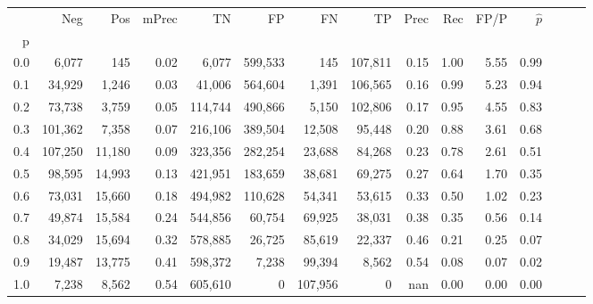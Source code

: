 \begin{tabular}{rrrrrrrrrrrrrrr}
\toprule
{} &      Neg &     Pos & mPrec &       TN &       FP &       FN &       TP &  Prec &   Rec &  FP/P & $\hat{p}$ \\
p   &          &         &       &          &          &          &          &       &       &       &           \\
\midrule
0.0 &    6,077 &     145 &  0.02 &    6,077 &  599,533 &      145 &  107,811 &  0.15 &  1.00 &  5.55 &      0.99 \\
0.1 &   34,929 &   1,246 &  0.03 &   41,006 &  564,604 &    1,391 &  106,565 &  0.16 &  0.99 &  5.23 &      0.94 \\
0.2 &   73,738 &   3,759 &  0.05 &  114,744 &  490,866 &    5,150 &  102,806 &  0.17 &  0.95 &  4.55 &      0.83 \\
0.3 &  101,362 &   7,358 &  0.07 &  216,106 &  389,504 &   12,508 &   95,448 &  0.20 &  0.88 &  3.61 &      0.68 \\
0.4 &  107,250 &  11,180 &  0.09 &  323,356 &  282,254 &   23,688 &   84,268 &  0.23 &  0.78 &  2.61 &      0.51 \\
0.5 &   98,595 &  14,993 &  0.13 &  421,951 &  183,659 &   38,681 &   69,275 &  0.27 &  0.64 &  1.70 &      0.35 \\
0.6 &   73,031 &  15,660 &  0.18 &  494,982 &  110,628 &   54,341 &   53,615 &  0.33 &  0.50 &  1.02 &      0.23 \\
0.7 &   49,874 &  15,584 &  0.24 &  544,856 &   60,754 &   69,925 &   38,031 &  0.38 &  0.35 &  0.56 &      0.14 \\
0.8 &   34,029 &  15,694 &  0.32 &  578,885 &   26,725 &   85,619 &   22,337 &  0.46 &  0.21 &  0.25 &      0.07 \\
0.9 &   19,487 &  13,775 &  0.41 &  598,372 &    7,238 &   99,394 &    8,562 &  0.54 &  0.08 &  0.07 &      0.02 \\
1.0 &    7,238 &   8,562 &  0.54 &  605,610 &        0 &  107,956 &        0 &   nan &  0.00 &  0.00 &      0.00 \\
\bottomrule
\end{tabular}
